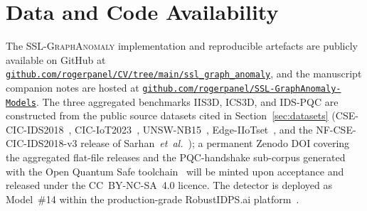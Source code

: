 \documentclass{ieeeaccess}
\begin{document}
\section*{Data and Code Availability}
The \textsc{SSL-GraphAnomaly} implementation and reproducible artefacts
are publicly available on GitHub at
\href{https://github.com/rogerpanel/CV/tree/main/ssl_graph_anomaly}%
{\texttt{github.com/rogerpanel/CV/tree/main/ssl\_graph\_anomaly}}, and
the manuscript companion notes are hosted at
\href{https://github.com/rogerpanel/SSL-GraphAnomaly-Models}%
{\texttt{github.com/rogerpanel/SSL-GraphAnomaly-Models}}. The three
aggregated benchmarks IIS3D, ICS3D, and IDS-PQC are constructed from the
public source datasets cited in Section~\ref{sec:datasets}
(CSE-CIC-IDS2018~\cite{sharafaldin2018cicids},
CIC-IoT2023~\cite{neto2023ciciot},
UNSW-NB15~\cite{moustafa2015unswnb15},
Edge-IIoTset~\cite{ferrag2022edgeiiot}, and the NF-CSE-CIC-IDS2018-v3
release of Sarhan~\emph{et~al.}~\cite{sarhan2022standard}); a permanent
Zenodo DOI covering the aggregated flat-file releases and the
PQC-handshake sub-corpus generated with the Open Quantum Safe
toolchain~\cite{stebila2020liboqs} will be minted upon acceptance and
released under the CC~BY-NC-SA~4.0 licence. The detector is deployed as
Model~\#14 within the production-grade RobustIDPS.ai
platform~\cite{robustidpsai2026zenodo}.
\end{document}

